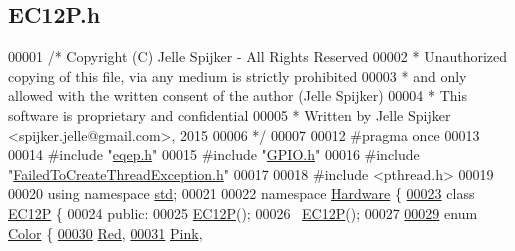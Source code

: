 \hypertarget{_e_c12_p_8h_source}{}\subsection{E\+C12\+P.\+h}
\label{_e_c12_p_8h_source}

\begin{DoxyCode}
00001 \textcolor{comment}{/* Copyright (C) Jelle Spijker - All Rights Reserved}
00002 \textcolor{comment}{ * Unauthorized copying of this file, via any medium is strictly prohibited}
00003 \textcolor{comment}{ * and only allowed with the written consent of the author (Jelle Spijker)}
00004 \textcolor{comment}{ * This software is proprietary and confidential}
00005 \textcolor{comment}{ * Written by Jelle Spijker <spijker.jelle@gmail.com>, 2015}
00006 \textcolor{comment}{ */}
00007 
00012 \textcolor{preprocessor}{#pragma once}
00013 
00014 \textcolor{preprocessor}{#include "\hyperlink{eqep_8h}{eqep.h}"}
00015 \textcolor{preprocessor}{#include "\hyperlink{_g_p_i_o_8h}{GPIO.h}"}
00016 \textcolor{preprocessor}{#include "\hyperlink{_failed_to_create_thread_exception_8h}{FailedToCreateThreadException.h}"}
00017 
00018 \textcolor{preprocessor}{#include <pthread.h>}
00019 
00020 \textcolor{keyword}{using namespace }\hyperlink{namespacestd}{std};
00021 
00022 \textcolor{keyword}{namespace }\hyperlink{namespace_hardware}{Hardware} \{
\hypertarget{_e_c12_p_8h_source_l00023}{}\hyperlink{class_hardware_1_1_e_c12_p}{00023} \textcolor{keyword}{class }\hyperlink{class_hardware_1_1_e_c12_p}{EC12P} \{
00024 \textcolor{keyword}{public}:
00025   \hyperlink{class_hardware_1_1_e_c12_p}{EC12P}();
00026   ~\hyperlink{class_hardware_1_1_e_c12_p}{EC12P}();
00027 
\hypertarget{_e_c12_p_8h_source_l00029}{}\hyperlink{class_hardware_1_1_e_c12_p_a8341f410cd939bf03160fe239bc782aa}{00029}   \textcolor{keyword}{enum} \hyperlink{class_hardware_1_1_e_c12_p_a8341f410cd939bf03160fe239bc782aa}{Color} \{
\hypertarget{_e_c12_p_8h_source_l00030}{}\hyperlink{class_hardware_1_1_e_c12_p_a8341f410cd939bf03160fe239bc782aaa3b57c8754eb52c7023d81c7c45687f05}{00030}     \hyperlink{class_hardware_1_1_e_c12_p_a8341f410cd939bf03160fe239bc782aaa3b57c8754eb52c7023d81c7c45687f05}{Red},     
\hypertarget{_e_c12_p_8h_source_l00031}{}\hyperlink{class_hardware_1_1_e_c12_p_a8341f410cd939bf03160fe239bc782aaab5841c141282166e57407746841ff248}{00031}     \hyperlink{class_hardware_1_1_e_c12_p_a8341f410cd939bf03160fe239bc782aaab5841c141282166e57407746841ff248}{Pink},    

\end{DoxyCode}
